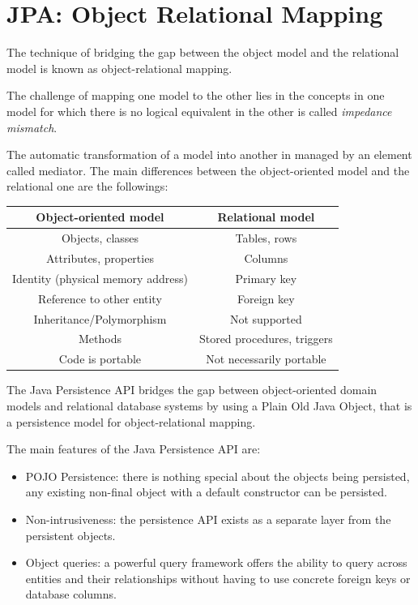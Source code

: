 \documentclass[12pt, a4paper]{report}
\begin{document}
    \section{JPA: Object Relational Mapping}
        The technique of bridging the gap between the object model and the relational model is known as object-relational mapping. 
        \begin{definition}
            The challenge of mapping one model to the other lies in the concepts in one model for which there is no logical equivalent in the other is called 
            \emph{impedance mismatch}.
        \end{definition}
        The automatic transformation of a model into another in managed by an element called mediator. The main differences between the object-oriented model and the 
        relational one are the followings: 
        \begin{table}[H]
            \centering
            \begin{tabular}{cc}
            \hline
            \textbf{Object-oriented model}     & \textbf{Relational model}   \\ \hline
            Objects, classes                   & Tables, rows                \\
            Attributes, properties             & Columns                     \\
            Identity (physical memory address) & Primary key                 \\
            Reference to other entity          & Foreign key                 \\
            Inheritance/Polymorphism           & Not supported               \\
            Methods                            & Stored procedures, triggers \\
            Code is portable                   & Not necessarily portable    \\ \hline
            \end{tabular}
        \end{table}
        The Java Persistence API bridges the gap between object-oriented domain models and relational database systems by using a Plain Old Java Object, that is a 
        persistence model for object-relational mapping. 

        The main features of the Java Persistence API are: 
        \begin{itemize}
            \item POJO Persistence: there is nothing special about the objects being persisted, any existing non-final object with a default constructor can be persisted.
            \item Non-intrusiveness: the persistence API exists as a separate layer from the persistent objects.
            \item Object queries: a powerful query framework offers the ability to query across entities and their relationships without having to use concrete foreign keys or database columns.
        \end{itemize}
\end{document}
